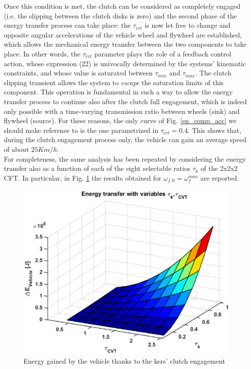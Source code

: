 \documentclass[11pt]{article}
\begin{document}
Once this condition is met, the clutch can be considered as completely engaged (i.e. the slipping between the clutch disks is zero) and the second phase of the energy transfer process can take place: the $\tau_{cvt}$ is now let free to change and opposite angular accelerations of the vehicle wheel and flywheel are established, which allows the mechanical energy transfer between the two components to take place. In other words, the $\tau_{cvt}$ parameter plays the role of a feedback control action, whose expression (22) is univocally determined by the systems' kinematic constraints, and whose value is saturated between $\tau_{min}$ and $\tau_{max}$. The clutch slipping transient allows the system to \textit{escape} the saturation limits of this component. This operation is fundamental in such a way to allow the energy transfer process to continue also after the clutch full engagement, which is indeed only possible with a time-varying transmission ratio between wheels (sink) and flywheel (source). For these reasons, the only curve of Fig. \ref{en_comp_acc} we should make reference to is the one parametrized in $\tau_{cvt}=0.4$. This shows that, during the clutch engagement process only, the vehicle can gain an average speed of about $25 Km/h$.\\For completeness, the same analysis has been repeated by considering the energy transfer also as a function of each of the eight selectable ratios $\tau_k$ of the 2x2x2 CFT. In particular, in Fig. \ref{en_comp_acc_3D} the results obtained for $\omega_{f,0} = \omega_f^{max}$ are reported. 

\begin{figure}[H]
\captionsetup{font=small, justification=centering}
\centering
\includegraphics[width=.55\textwidth]{Images/Results_new/Univariate_SteadyState/en_comp_acc_3D.eps}
\caption{Energy gained by the vehicle thanks to the kers' clutch engagement}
\label{en_comp_acc_3D}
\end{figure}    
\end{document}
